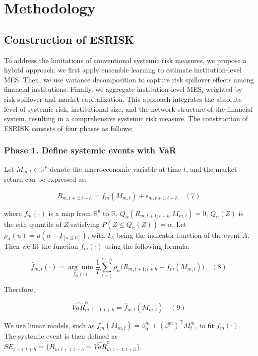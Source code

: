 \documentclass[12pt,a4paper]{article}
\begin{document}
    \section{Methodology}

    \subsection{Construction of ESRISK}

    To address the limitations of conventional systemic risk measures, we propose a hybrid approach: we first apply ensemble learning to estimate institution-level MES. Then, we use variance decomposition to capture risk spillover effects among financial institutions. Finally, we aggregate institution-level MES, weighted by risk spillover and market capitalization. This approach integrates the absolute level of systemic risk, institutional size, and the network structure of the financial system, resulting in a comprehensive systemic risk measure. The construction of ESRISK consists of four phases as follows:

    \subsubsection{Phase 1. Define systemic events with VaR}

    Let $M_{m,t} \in \mathbb{R}^{p}$ denote the macroeconomic variable at time $t$, and the market return can be expressed as:

    \[
    R_{m,t+1:t+h} = f_{m}(M_{m,t}) + \epsilon_{m,t+1:t+h} \quad (7)
    \]

    where $f_{m}(\cdot)$ is a map from $\mathbb{R}^{p}$ to $\mathbb{R}$, $Q_{\alpha}(R_{m,t+1:t+h}|M_{m,t}) = 0$, $Q_{\alpha}(Z)$ is the $\alpha$th quantile of $Z$ satisfying $P(Z\leq Q_{\alpha}(Z)) = \alpha$. Let $\rho_{\alpha}(u) = u(\alpha - I_{[u\leq 0]})$, with $I_{A}$ being the indicator function of the event $A$. Then we fit the function $f_{m}(\cdot)$ using the following formula:

    \[
    \widehat{f}_{m,t}(\cdot) = \underset {f_{m}(\cdot)}{\arg\min}\frac{1}{T}\sum_{i=1}^{t-h}\rho_{\alpha}\Big(R_{m,i+1:i+h} - f_{m}(M_{m,i})\Big) \quad (8)
    \]

    Therefore,

    \[
    \widehat{VaR}_{m,t+1:t+h}^{\alpha} = \widehat{f}_{m,t}(M_{m,t}) \quad (9)
    \]

    We use linear models, such as $f_{m}(M_{m,t}) = \beta_{0}^{m} + (\beta^{m})^{\top}M_{t}^{m}$, to fit $f_{m}(\cdot)$. The systemic event is then defined as $SE_{t+1:t+h} = \{R_{m,t+1:t+h} = \widehat{VaR}_{m,t+1:t+h}^{\alpha}\}$.
\end{document}
